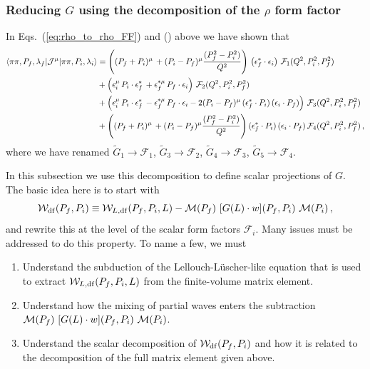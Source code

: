 {\mh 
\subsubsection{Reducing $G$ using the decomposition of the $\rho$ form factor}

In Eqs.~(\ref{eq:rho_to_rho_FF}) and () above we have shown that 
\begin{align}
\langle \pi \pi, P_f, \lambda_f | {\mathcal{J}}^{\mu} | \pi \pi, P_i, \lambda_i \rangle
&=
\left((P_f+P_i)^\mu \,+(P_i-P_f)^\mu\frac{(P_f^2-P_i^2)}{Q^2} \right)\,\left(\epsilon_f^*\cdot \epsilon_i\right)\, \mathcal{F}_1(Q^2,P_i^2,P_f^2)\,
\nonumber\\&
+\left(\epsilon_i^\mu\, P_i \cdot \epsilon_f^*\,
+\epsilon_f^{*\mu}\, P_f\cdot \epsilon_i\right)\,\mathcal{F}_2(Q^2,P_i^2,P_f^2)\,
\nonumber\\
&+\left(\epsilon_i^\mu\, P_i\cdot \epsilon_f^*\,-\epsilon_f^{*\mu}\, P_f\cdot \epsilon_i
-2
(P_i-P_f)^\mu \,(\epsilon_f^*\cdot P_i)\,(\epsilon_i\cdot P_f)
\right)
\, \mathcal F_3(Q^2,P_i^2,P_f^2)
\nonumber\\&
+\left((P_f+P_i)^\mu \,+(P_i-P_f)^\mu\frac{(P_f^2-P_i^2)}{Q^2} \right)(\epsilon_f^*\cdot P_i)\,(\epsilon_i\cdot P_f)\,\mathcal {F}_4(Q^2,P_i^2,P_f^2) \,,
\end{align}
where we have renamed $\widetilde{G}_1 \to \mathcal F_1$, $\widetilde{G}_3 \to \mathcal F_2$, $\widetilde{G}_4 \to \mathcal F_3$, $\widetilde{G}_5 \to \mathcal F_4$.

In this subsection we use this decomposition to define scalar projections of $G$. The basic idea here is to start with
\begin{equation}
\label{eq:WtiltoWdf2}
 {\mathcal{W}}_{\rm df}(P_f,P_i)  \equiv {\mathcal{W}}_{L,{\rm df}}(P_f,P_i,L) -  \mathcal  M(P_f) \ [G(L) \cdot w](P_f,P_i) \ \mathcal M(P_i)    \,,
 \end{equation}
 and rewrite this at the level of the scalar form factors $\mathcal F_i$. Many issues must be addressed to do this property. To name a few, we must
 \begin{enumerate}
\item Understand the subduction of the Lellouch-L\"uscher-like equation that is used to extract ${\mathcal{W}}_{L,{\rm df}}(P_f,P_i,L)$ from the finite-volume matrix element.
\item Understand how the mixing of partial waves enters the subtraction $\mathcal  M(P_f) \ [G(L) \cdot \w](P_f,P_i) \ \mathcal M(P_i)$.
\item Understand the scalar decomposition of $ {\mathcal{W}}_{\rm df}(P_f,P_i) $ and how it is related to the decomposition of the full matrix element given above.
\end{enumerate}

}

